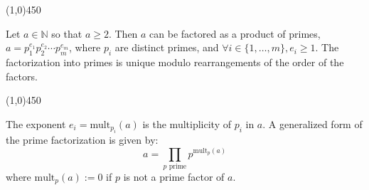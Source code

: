     \begin{center}
        \vspace{10pt}
        \line(1,0){450}
        \vspace{25pt}
    \end{center}
    
    \begin{theorem}
    Let $a \in \mathbb{N}$ so that $a \geq 2$. Then $a$ can be factored as a product of primes, $a = p_1^{e_1}p_2^{e_2} \cdots p_m^{e_m}$, where $p_i$ are distinct primes, and $\forall i \in \{1, \dots, m\}, e_i \geq 1$.
    The factorization into primes is unique modulo rearrangements of the order of the factors.
    \end{theorem}
    
\begin{center}
    \vspace{10pt}
    \line(1,0){450}
    \vspace{25pt}
\end{center}
\newpage
    
    \begin{remark}
    The exponent $e_i = \text{mult}_{p_i}(a)$ is the multiplicity of $p_i$ in $a$.
    A generalized form of the prime factorization is given by:
    $$ a = \prod_{p \text{ prime}} p^{\text{mult}_p(a)} $$
    where $\text{mult}_p(a) := 0$ if $p$ is not a prime factor of $a$.
    \end{remark}

